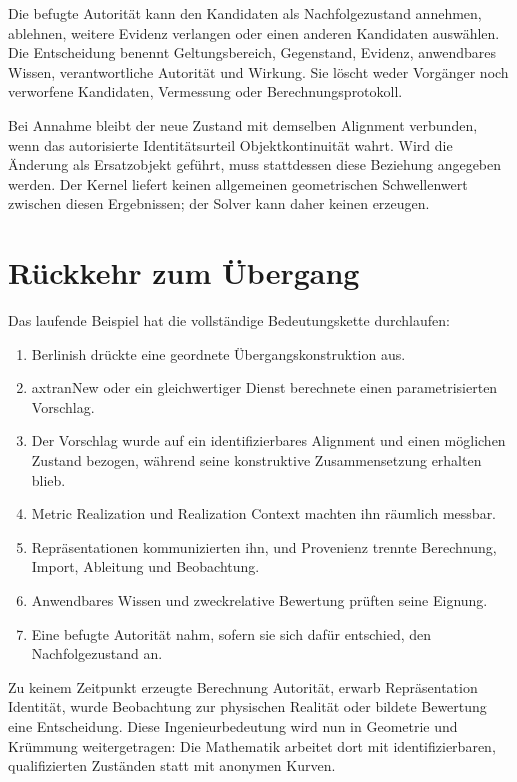 Die befugte Autorität kann den Kandidaten als Nachfolgezustand annehmen,
ablehnen, weitere Evidenz verlangen oder einen anderen Kandidaten auswählen.
Die Entscheidung benennt Geltungsbereich, Gegenstand, Evidenz, anwendbares
Wissen, verantwortliche Autorität und Wirkung. Sie löscht weder Vorgänger noch
verworfene Kandidaten, Vermessung oder Berechnungsprotokoll.

Bei Annahme bleibt der neue Zustand mit demselben Alignment verbunden, wenn das
autorisierte Identitätsurteil Objektkontinuität wahrt. Wird die Änderung als
Ersatzobjekt geführt, muss stattdessen diese Beziehung angegeben werden. Der
Kernel liefert keinen allgemeinen geometrischen Schwellenwert zwischen diesen
Ergebnissen; der Solver kann daher keinen erzeugen.

\section{Rückkehr zum Übergang}

Das laufende Beispiel hat die vollständige Bedeutungskette durchlaufen:

\begin{enumerate}
\item Berlinish drückte eine geordnete Übergangskonstruktion aus.
\item axtranNew oder ein gleichwertiger Dienst berechnete einen
  parametrisierten Vorschlag.
\item Der Vorschlag wurde auf ein identifizierbares Alignment und einen
  möglichen Zustand bezogen, während seine konstruktive Zusammensetzung
  erhalten blieb.
\item Metric Realization und Realization Context machten ihn räumlich messbar.
\item Repräsentationen kommunizierten ihn, und Provenienz trennte Berechnung,
  Import, Ableitung und Beobachtung.
\item Anwendbares Wissen und zweckrelative Bewertung prüften seine Eignung.
\item Eine befugte Autorität nahm, sofern sie sich dafür entschied, den
  Nachfolgezustand an.
\end{enumerate}

Zu keinem Zeitpunkt erzeugte Berechnung Autorität, erwarb Repräsentation
Identität, wurde Beobachtung zur physischen Realität oder bildete Bewertung
eine Entscheidung. Diese Ingenieurbedeutung wird nun in Geometrie und
Krümmung weitergetragen: Die Mathematik arbeitet dort mit identifizierbaren,
qualifizierten Zuständen statt mit anonymen Kurven.
